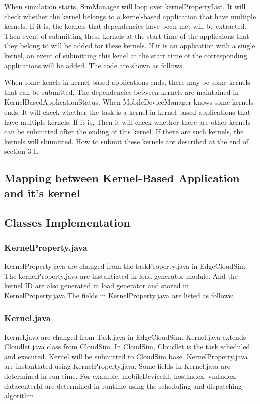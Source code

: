 When simulation starts, SimManager will loop over  kernelPropertyList. It will check whether the kernel belongs to a kernel-based application that have multiple kernels. If it is, the kernels that dependencies have been met will be extracted. Then event of submitting these kernels at the start time of the applicaions that they belong to will be added for these kernels. If it is an application with a single kernel, an event of submitting this kenel at the start time of the corresponding applications will be added. The code are shown as follows.


When some kenels in kernel-based applications ends, there may be some kernels that can be submitted. The dependencies between kernels are maintained in KernelBasedApplicationStatus. When MobileDeviceManager knows some kernels ends. It will check whether the task is a kernel in kernel-based applications that have multiple kernels. If it is, Then it will check whether there are other kernels can be submitted after the ending of this kernel. If there are such kernels, the kernels will sbumitted. How to submit these kernels are described at the end of section 3.1.

\subsection{Mapping between Kernel-Based Application and it's kernel}


\subsection{Classes Implementation}

\subsubsection{KernelProperty.java}
KernelProperty.java are changed from the taskProperty.java in EdgeCloudSim. The kernelProperty.java are instantiated in load generator module. And the kernel ID are also generated in load generator and stored in KernelProperty.java.The fields in KernelProperty.java are listed as follows:



\subsubsection{Kernel.java}
Kernel.java are changed from Task.java in EdgeCloudSim. Kernel.java extends Cloudlet.java class from CloudSim. In CloudSim, Cloudlet is the task scheduled and executed. Kernel will be submitted to CloudSim base. KernelProperty.java are instantiated using KernelProperty.java. Some fields in Kernel.java are determined in run-time. For example, mobileDeviceId, hostIndex, vmIndex, datacenterId are determined in runtime using the scheduling and dispatching algorithm.




